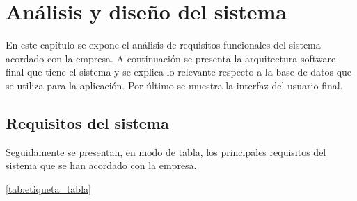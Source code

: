\chapter{Análisis y diseño del sistema}

En este capítulo se expone el análisis de requisitos funcionales del sistema acordado con la empresa. A continuación se presenta la arquitectura software final que tiene el sistema y se explica lo relevante respecto a la base de datos que se utiliza para la aplicación. Por último se muestra la interfaz del usuario final.

\section{Requisitos del sistema}

Seguidamente se presentan, en modo de tabla, los principales requisitos del sistema que se han acordado con la empresa.


\ref{tab:etiqueta_tabla}

